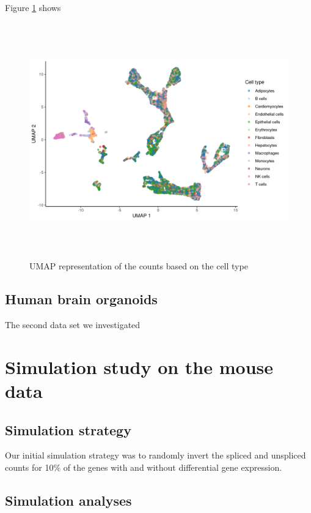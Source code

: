 Figure \ref{fig:UMAP_mouse_cell_type} shows 

\begin{figure}[!htb]
\begin{center}
\includegraphics[width=6in,height=4in]{figure/kidney_mouse/UMAP_cell_type.png}
\end{center}
\caption{UMAP representation of the counts based on the cell type}
\label{fig:UMAP_mouse_cell_type}
\end{figure}
\FloatBarrier

\subsection{Human brain organoids}
The second data set we investigated


\citep{brain_organoids}

\section{Simulation study on the mouse data}

\subsection{Simulation strategy}
Our initial simulation strategy was to randomly invert the spliced and unspliced counts for 10\% of the genes with and without differential gene expression. 

\subsection{Simulation analyses}

